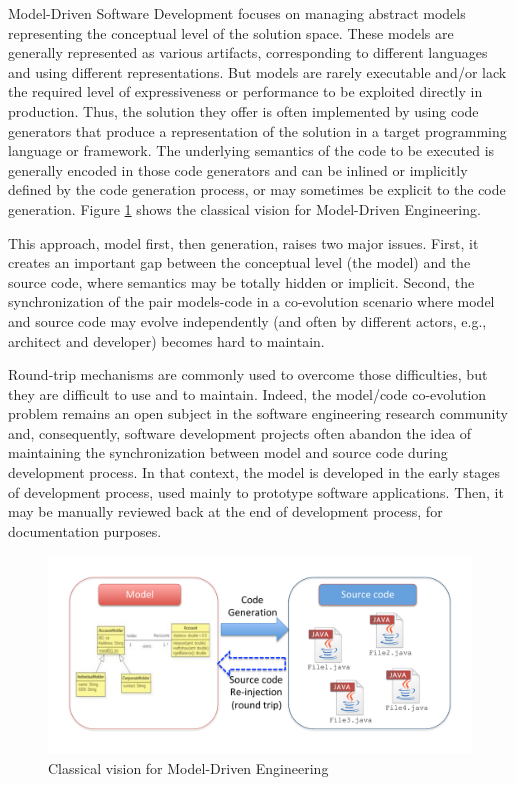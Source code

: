 

Model-Driven Software Development focuses on managing abstract models representing the conceptual level of the solution space. These models are generally represented as various artifacts, corresponding to different languages and using different representations. But models are rarely executable and/or lack the required level of expressiveness or performance to be exploited directly in production. Thus, the solution they offer is often implemented by using code generators that produce a representation of the solution in a target programming language or framework\cite{stahl2006model}. The underlying semantics of the code to be executed is generally encoded in those code generators and can be inlined or implicitly defined by the code generation process, or may sometimes be explicit to the code generation. Figure \ref{fig:ClassicalVision} shows the classical vision for Model-Driven Engineering.

This approach, model first, then generation, raises two major issues. First, it creates an important gap between the conceptual level (the model) and the source code, where semantics may be totally hidden or implicit. Second, the synchronization of the pair models-code in a co-evolution scenario where model and source code may evolve independently (and often by different actors, e.g., architect and developer) becomes hard to maintain.

Round-trip mechanisms are commonly used to overcome those difficulties, but they are difficult to use and to maintain. Indeed, the model/code co-evolution problem remains an open subject in the software engineering research community and, consequently, software development projects often abandon the idea of maintaining the synchronization between model and source code during development process. In that context, the model is developed in the early stages of development process, used mainly to prototype software applications. Then, it may be manually reviewed back at the end of development process, for documentation purposes.

\begin{figure}
    \centering
    \includegraphics[width=1.0\columnwidth]{ClassicalVision.pdf}
    \caption{Classical vision for Model-Driven Engineering}
    \label{fig:ClassicalVision}
\end{figure}

